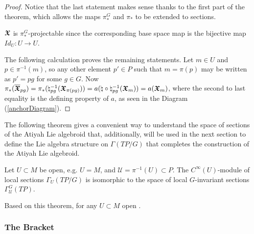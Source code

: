 \begin{proof}
Notice that the last statement makes sense thanks to the first part of the theorem, which allows the maps $\pi_*^G$ and $\pi_*$ to be extended to sections.%

$\bm{\mathfrak{X}}$ is $\pi_*^G$-projectable since the corresponding base space map is the bijective map $Id_U: U \to U$.

The following calculation proves the remaining statements. Let $m \in U$ and $p \in \pi^{-1}(m)$, so any other element $p' \in P$ such that $m = \pi(p)$ may be written as $p' = pg$ for some $g \in G$. Now %
$\pi_*(\overline{\bm{\bm{\mathfrak{X}}}}_{pg}) = \pi_*(\natural^{-1}_{pg}(\bm{\mathfrak{X}}_{\pi(pg)})) = a(\natural \circ \natural^{-1}_{pg}(\bm{\mathfrak{X}}_{m})) = a(\bm{\mathfrak{X}}_{m})$, where the second to last equality is the defining property of $a$, as seen in the Diagram (\ref{anchorDiagram}). 
\end{proof}

The following theorem gives a convenient way to understand the space of sections of the Atiyah Lie algebroid that, additionally, will be used in the next section to define the Lie algebra structure on $\Gamma(TP/G)$ that completes the construction of the Atiyah Lie algebroid.

\begin{theorem}\label{theoSectTPG}
Let $U \subset M$ be open, e.g. $U = M$, and $\mathcal U = \pi^{-1}(U) \subset P$. The $C^\infty(U)$-module of local sections $\Gamma_U(TP/G)$ is isomorphic to the space of local $G$-invariant sections $\Gamma^G_{\mathcal U}(TP)$.
\end{theorem}

Based on this theorem, for any $U \subset M$ open .

\subsubsection{The Bracket}

